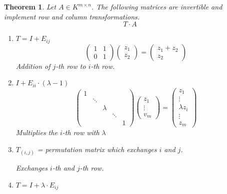 \documentclass[a4paper,landscape,twocolumn]{article}
\newtheorem{theorem}{Theorem}[section]
\begin{document}
\begin{theorem}
  \label{satz-6.27}
  Let $A \in K^{m\times n}$. The following matrices are invertible and implement
  row and column transformations.
  \[ T \cdot A \]
  \begin{enumerate}
    \item $T = I + E_{ij}$
      \[
        \begin{pmatrix}
          1 & 1 \\
          0 & 1
        \end{pmatrix}
        \begin{pmatrix}
          z_1 \\
          z_2
        \end{pmatrix}
        = \begin{pmatrix}
          z_1 + z_2 \\
          z_2
        \end{pmatrix}
      \]
      Addition of $j$-th row to $i$-th row.
    \item $I + E_{ii} \cdot (\lambda - 1)$
      \[
        \begin{pmatrix}
          1 &        &         &        & \\
            & \ddots &         &        & \\
            &        & \lambda &        & \\
            &        &         & \ddots & \\
            &        &         &        & 1
        \end{pmatrix}
        \begin{pmatrix}
          z_1 \\
          \vdots \\
          v_m
        \end{pmatrix}
        =
        \begin{pmatrix}
          z_1 \\
          \vdots \\
          \lambda z_i \\
          \vdots \\
          z_m
        \end{pmatrix}
      \]
      Multiplies the $i$-th row with $\lambda$
    \item $T_{(i,j)}$ = permutation matrix which exchanges $i$ and $j$.

      Exchanges $i$-th and $j$-th row.
    \item $T = I + \lambda \cdot E_{ij}$


\end{enumerate}
\end{theorem}
\end{document}
